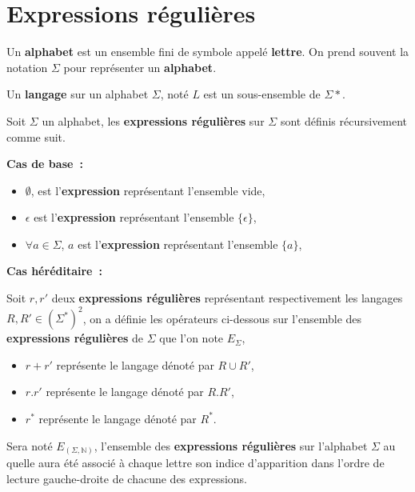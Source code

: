 \section{Expressions régulières}

\begin{Definition}
  Un \textbf{alphabet} est un ensemble fini de symbole appelé \textbf{lettre}.
  On prend souvent la notation \(\Sigma\) pour représenter un \textbf{alphabet}.
\end{Definition}

\begin{Definition}
  Un \textbf{langage} sur un alphabet \(\Sigma\), noté \(L\) est un 
  sous-ensemble de \(\Sigma*\).
\end{Definition}

\begin{Definition}
  Soit \(\Sigma\) un alphabet, les \textbf{expressions régulières} sur 
  \(\Sigma\) sont définis récursivement comme suit.

  \noindent\textbf{Cas de base~:}

  \begin{itemize}
    \item \(\emptyset\), est l'\textbf{expression} représentant l'ensemble vide,
    \item \(\epsilon\) est l'\textbf{expression} représentant l'ensemble 
    \(\{\epsilon\}\),
    \item \(\forall a \in \Sigma\), \(a\) est l'\textbf{expression} représentant 
    l'ensemble \(\{a\}\),
  \end{itemize}

  \noindent\textbf{Cas héréditaire~:}

  Soit \(r, r'\) deux \textbf{expressions régulières} représentant 
  respectivement les langages \(R, R' \in (\Sigma^*)^2\), on a définie les 
  opérateurs ci-dessous sur l'ensemble des \textbf{expressions régulières} de 
  \(\Sigma\) que l'on note \(E_{\Sigma}\), 

  \begin{itemize}
    \item \(r + r'\) représente le langage dénoté par \(R \cup R'\),
    \item \(r . r'\) représente le langage dénoté par \(R . R'\),
    \item \(r^*\) représente le langage dénoté par \(R^*\).
  \end{itemize}
\end{Definition}

\begin{Definition}
  Sera noté \(E_{(\Sigma, \mathbb{N})}\), l'ensemble des 
  \textbf{expressions régulières} sur l'alphabet \(\Sigma\) au quelle aura été 
  associé à chaque lettre son indice d'apparition dans l'ordre de lecture 
  gauche-droite de chacune des expressions.
\end{Definition}

